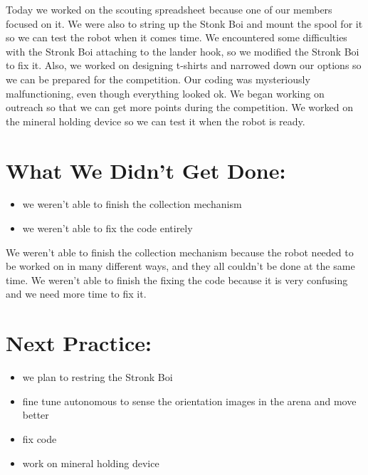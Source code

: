 \documentclass[12pt]{article}
\begin{document}
Today we worked on the scouting spreadsheet because one of our members focused on it. We were also to string up the Stonk Boi and mount the spool for it so we can test the robot when it comes time. We encountered some difficulties with the Stronk Boi attaching to the lander hook, so we modified the Stronk Boi to fix it. Also, we worked on designing t-shirts and narrowed down our options so we can be prepared for the competition. Our coding was mysteriously malfunctioning, even though everything looked ok. We began working on outreach so that we can get more points during the competition. We worked on the mineral holding device so we can test it when the robot is ready.

\section{What We Didn't Get Done:} %
\begin{itemize}
	\item we weren’t able to finish the collection mechanism
\item we weren’t able to fix the code entirely
\end{itemize}

We weren’t able to finish the collection mechanism because the robot needed to be worked on in many different ways, and they all couldn’t be done at the same time. We weren’t able to finish the fixing the code because it is very confusing and we need more time to fix it.

\section{Next Practice:}
\begin{itemize}
	\item we plan to restring the Stronk Boi
\item fine tune autonomous to sense the orientation images in the arena and move better
\item fix code
\item work on mineral holding device
\end{itemize}
\end{document}
